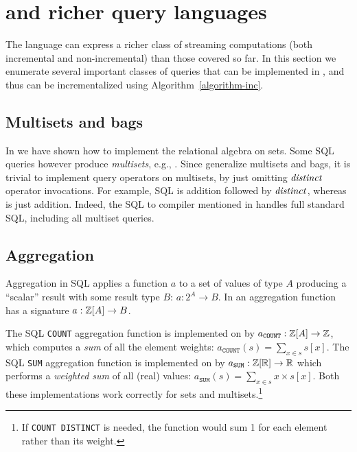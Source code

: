 \section{\dbsp and richer query languages}\label{sec:extensions}

The \dbsp language can express a richer class of streaming computations (both incremental and non-incremental)
than those covered so far. In this section we enumerate several important classes of 
queries that can be implemented in \dbsp, and thus can be incrementalized using Algorithm~\ref{algorithm-inc}.

\subsection{Multisets and bags}

In  we have shown how to implement the relational algebra on sets.
Some SQL queries however produce \emph{multisets}, e.g., .
Since \zrs generalize multisets and bags, it is trivial to implement query
operators on multisets, by just omitting $\mathit{distinct}$ operator invocations.  
For example, SQL  is \zr addition followed by $\mathit{distinct}$, 
whereas  is just \zr addition.  Indeed, the SQL to \dbsp compiler
mentioned in  handles full standard SQL, including 
all multiset queries.

\subsection{Aggregation}\label{sec:aggregation}

Aggregation in SQL applies a function $a$ to a set of values of type $A$ producing a ``scalar''
result with some result type $B$: $a: 2^A \to B$.  In \dbsp an aggregation function has
a signature $a: \mathbb{Z}[A] \to B$.  

The SQL \texttt{COUNT} aggregation function is implemented on \zrs by $a_\texttt{COUNT} : \mathbb{Z}[A] \to \mathbb{Z}$, which
computes a \emph{sum} of all the element weights: $a_\texttt{COUNT}(s) = \sum_{x \in s} s[x]$.
The SQL \texttt{SUM} aggregation function is implemented on \zrs by $a_\texttt{SUM}: \mathbb{Z}[\mathbb{R}] \to \mathbb{R}$ which
performs a \emph{weighted sum} of all (real) values: $a_\texttt{SUM}(s) = \sum_{x \in s} x \times s[x]$.
Both these implementations work correctly for sets and multisets.\footnote{If \texttt{COUNT DISTINCT} is needed,
the function would sum 1 for each element rather than its weight.}

